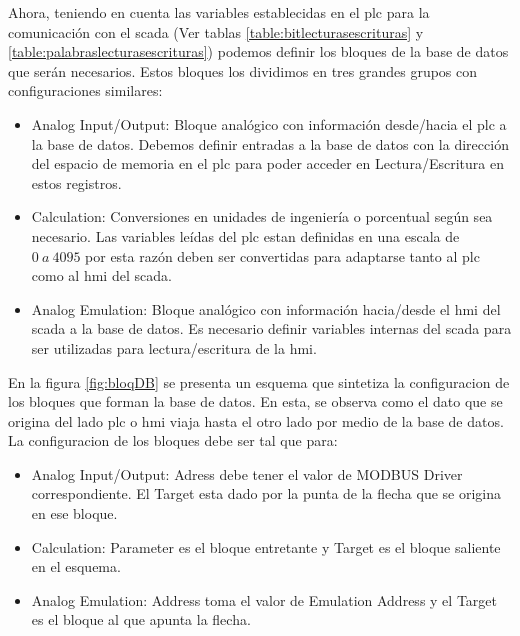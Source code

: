 Ahora, teniendo en cuenta las variables establecidas en el \gls{plc} 
para la comunicación con el \gls{scada} (Ver 
tablas \ref{table:bitlecturasescrituras} y 
\ref{table:palabraslecturasescrituras}) podemos definir los bloques de la base 
de datos que serán necesarios. Estos bloques los dividimos en tres 
grandes grupos con configuraciones similares:
 
\begin{itemize}
 \item Analog Input/Output: Bloque analógico con información desde/hacia el 
  \gls{plc} a la base de datos. Debemos definir entradas a la base de datos con 
  la dirección del espacio de memoria en el \gls{plc} para poder acceder en 
  Lectura/Escritura en estos registros.
 \item Calculation:  Conversiones en unidades de ingeniería o porcentual 
  según sea necesario. Las variables leídas del \gls{plc} estan definidas en 
  una escala de $0~a~4095$ por esta razón deben ser convertidas para adaptarse 
  tanto al \gls{plc} como al \gls{hmi} del \gls{scada}.
 \item Analog Emulation: Bloque analógico con información hacia/desde el 
  \gls{hmi} del \gls{scada} a la base de datos. Es necesario definir variables 
  internas del \gls{scada} para ser utilizadas para lectura/escritura de la 
  \gls{hmi}.
\end{itemize}

En la figura \ref{fig:bloqDB} se presenta un esquema que sintetiza la 
configuracion de los bloques que forman la base de datos. En esta, se observa 
como el dato que se origina del lado \gls{plc} o \gls{hmi} viaja hasta el otro 
lado por medio de la base de datos.
La configuracion de los bloques debe ser tal que para:
\begin{itemize}
  \item Analog Input/Output: Adress debe tener el valor de MODBUS Driver 
  correspondiente. El Target esta dado por la punta de la flecha que se origina 
  en ese bloque.
  \item Calculation: Parameter es el bloque entretante y Target es el bloque 
  saliente en el esquema.
  \item Analog Emulation: Address toma el valor de Emulation Address y el 
  Target es el bloque al que apunta la flecha. 
\end{itemize}



